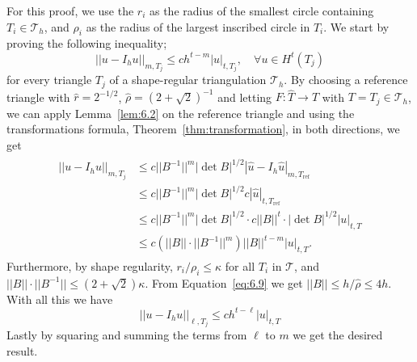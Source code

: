 \begin{bev}
    For this proof, we use the $r_i$ as the radius of the smallest circle containing $T_i\in \mathcal{T}_h$, 
    and $\rho_i$ as the radius of the largest inscribed circle in $T_i$.
    We start by proving the following inequality;
    \begin{equation}
        ||u-I_h u||_{m,T_j} \leq c h^{t-m} |u|_{t,T_j}, \quad \forall u \in H^t(T_j)
    \end{equation}
    for every triangle $T_j$ of a shape-regular triangulation $\mathcal{T}_h$. 
    By choosing a reference triangle with $\hat{r} = 2^{-1/2}$, $\hat{\rho} = {(2+\sqrt{2})}^{-1}$ and letting $F : \hat{T} \to T$ with $T = T_j \in \mathcal{T}_h$, 
    we can apply Lemma~\ref{lem:6.2} on the reference triangle and using the transformations formula, Theorem~\ref{thm:transformation}, in both directions, we get
    \begin{align}
        \begin{split}
        ||u-I_h u||_{m,T_j} &\leq c ||B^{-1}||^m |\det B |^{1/2} |\hat{u} - I_h \hat{u}|_{m,T_{\text{ref}}} \\
                            &\leq c ||B^{-1}||^m |\det B |^{1/2} c | \hat{u} |_{t,T_{\text{ref}}} \\
                            &\leq c ||B^{-1}||^m |\det B |^{1/2} \cdot c ||B||^t \cdot |\det B |^{1/2} |u|_{t,T}  \\
                         &\leq c \left( ||B||  \cdot ||B^{-1}||^m \right) ||B||^{t-m} |u|_{t,T}.
        \end{split}
    \end{align}
    Furthermore, by shape regularity, $r_i / \rho_i \leq \kappa$ for all $T_i$ in $\mathcal{T}$, and $||B|| \cdot ||B^{-1}|| \leq \left( 2 + \sqrt{2} \right)\kappa$. 
    From Equation~\eqref{eq:6.9} we get $||B|| \leq h/\hat{\rho}\leq 4h$.
    With all this we have
    \begin{equation}
        ||u-I_h u||_{\ell,T_j} \leq c h^{t-\ell} |u|_{t,T}
    \end{equation}
    Lastly by squaring and summing the terms from $\ell$ to $m$ we get the desired result.
\end{bev}
